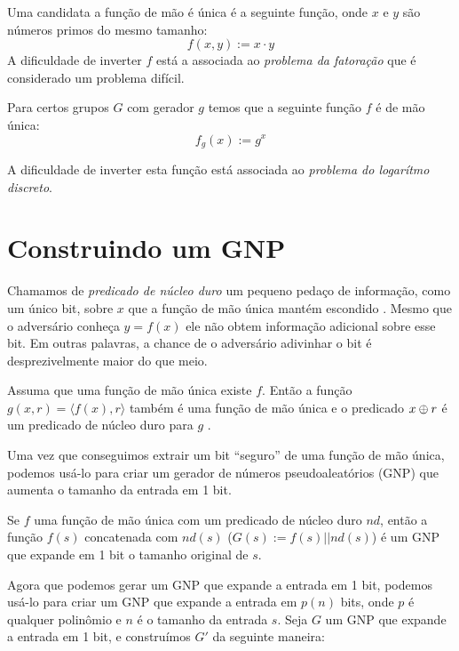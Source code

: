 \begin{example}
  Uma candidata a função de mão é única é a seguinte função, onde $x$ e $y$ são números primos do mesmo tamanho:
  \begin{displaymath}
    f(x,y) := x \cdot y
  \end{displaymath}
  A dificuldade de inverter $f$ está a associada ao {\em problema da fatoração} que é considerado um problema difícil.

  Para certos grupos $G$ com gerador $g$ temos que a seguinte função $f$ é de mão única:
  \begin{displaymath}
    f_g(x) := g^x
  \end{displaymath}

A dificuldade de inverter esta função está associada ao {\em problema do logarítmo discreto}.
\end{example}

\section{Construindo um GNP}

Chamamos de {\em predicado de núcleo duro} um pequeno pedaço de informação, como um único bit, sobre $x$ que a função de mão única mantém escondido \cite{Blum84}.
Mesmo que o adversário conheça $y = f(x)$ ele não obtem informação adicional sobre esse bit.
Em outras palavras, a chance de o adversário adivinhar o bit é desprezivelmente maior do que meio.

\begin{theorem}
  Assuma que uma função de mão única existe $f$.
  Então a função $g(x,r) = \langle f(x), r \rangle$ também é uma função de mão única e o predicado $x \oplus r$ é um predicado de núcleo duro para $g$ \cite{Goldreich89}.
\end{theorem}

Uma vez que conseguimos extrair um bit ``seguro'' de uma função de mão única, podemos usá-lo para criar um gerador de números pseudoaleatórios (GNP) que aumenta o tamanho da entrada em 1 bit.

\begin{theorem}
  Se $f$ uma função de mão única com um predicado de núcleo duro $nd$, então a função $f(s)$ concatenada com $nd(s)$ ($G(s) := f(s)||nd(s)$) é um GNP que expande em 1 bit o tamanho original de $s$.
\end{theorem}

Agora que podemos gerar um GNP que expande a entrada em 1 bit, podemos usá-lo para criar um GNP que expande a entrada em $p(n)$ bits, onde $p$ é qualquer polinômio e $n$ é o tamanho da entrada $s$.
Seja $G$ um GNP que expande a entrada em 1 bit, e construímos $G'$ da seguinte maneira:

